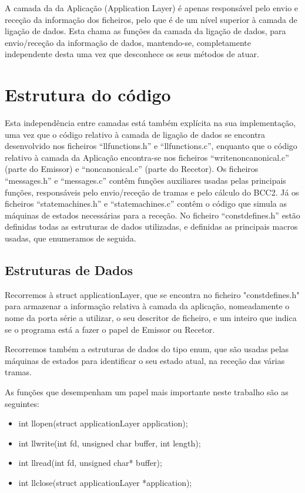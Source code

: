 \documentclass[article, a4paper, 11pt, oneside]{memoir}
\begin{document}
A camada da da Aplicação (Application Layer) é apenas responsável pelo envio e receção da informação dos ficheiros, pelo que é de um nível superior à camada de ligação de dados.
Esta chama as funções da camada da ligação de dados, para envio/receção da informação de dados, 
mantendo-se, completamente independente desta uma vez que desconhece os seus métodos de atuar.

\chapter[Estrutura do código][Estrutura do código]{Estrutura do código} \label{\thechapter}

Esta independência entre camadas está também explícita na sua implementação, uma vez que o código relativo à camada de ligação de dados se 
encontra desenvolvido nos ficheiros “llfunctions.h” e “llfunctions.c”, enquanto que o código relativo à camada da Aplicação encontra-se nos ficheiros 
“writenoncanonical.c” (parte do Emissor) e “noncanonical.c” (parte do Recetor). Os ficheiros “messages.h” e “messages.c” contêm funções auxiliares 
usadas pelas principais funções, responsáveis pelo envio/receção de tramas e pelo cálculo do BCC2. 
Já os ficheiros “state\textunderscore machines.h” e “state\textunderscore machines.c” contêm o código que simula as máquinas de estados necessárias para a receção.
No ficheiro “constdefines.h” estão definidas todas as estruturas de dados utilizadas, e definidas as principais macros usadas, que enumeramos de seguida.

\section{Estruturas de Dados}
Recorremos à struct applicationLayer, que se encontra no ficheiro "const\textunderscore defines.h" para armazenar a informação relativa à camada da aplicação, nomeadamente o nome da porta série a utilizar, 
o seu descritor de ficheiro, e um inteiro que indica se o programa está a fazer o papel de Emissor ou Recetor.

Recorremos também a estruturas de dados do tipo enum, que são usadas pelas máquinas de estados para identificar o seu estado atual, na receção das várias tramas.

As funções que desempenham um papel mais importante neste trabalho são as seguintes:
\begin{itemize}
	\item int llopen(struct applicationLayer application);
	\item int llwrite(int fd, unsigned char buffer, int length);
	\item int llread(int fd, unsigned char* buffer);
	\item int llclose(struct applicationLayer *application);
\end{itemize}
\end{document}
